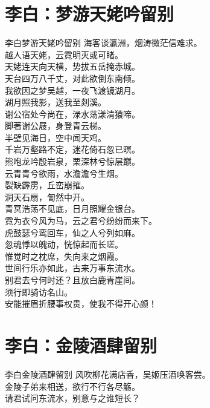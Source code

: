 \documentclass[12pt,oneside,a5paper]{book}
\begin{document}
\chapter{李白：梦游天姥吟留别}
\begin{poemzh}{李白}{梦游天姥吟留别}
海客谈瀛洲，烟涛微茫信难求。\\
越人语天姥，云霓明灭或可睹。\\
天姥连天向天横，势拔五岳掩赤城。\\
天台四万八千丈，对此欲倒东南倾。\\
我欲因之梦吴越，一夜飞渡镜湖月。\\
湖月照我影，送我至剡溪。\\
谢公宿处今尚在，渌水荡漾清猿啼。\\
脚著谢公屐，身登青云梯。\\
半壁见海日，空中闻天鸡。\\
千岩万壑路不定，迷花倚石忽已暝。\\
熊咆龙吟殷岩泉，栗深林兮惊层巅。\\
云青青兮欲雨，水澹澹兮生烟。\\
裂缺霹雳，丘峦崩摧。\\
洞天石扇，訇然中开。\\
青冥浩荡不见底，日月照耀金银台。\\
霓为衣兮风为马，云之君兮纷纷而来下。\\
虎鼓瑟兮鸾回车，仙之人兮列如麻。\\
忽魂悸以魄动，恍惊起而长嗟。\\
惟觉时之枕席，失向来之烟霞。\\
世间行乐亦如此，古来万事东流水。\\
别君去兮何时还？且放白鹿青崖间。\\
须行即骑访名山。\\
安能摧眉折腰事权贵，使我不得开心颜！\\ 
\end{poemzh}

\chapter{李白：金陵酒肆留别}
\begin{poemzh}{李白}{金陵酒肆留别}
风吹柳花满店香，吴姬压酒唤客尝。\\
金陵子弟来相送，欲行不行各尽觞。\\
请君试问东流水，别意与之谁短长？\\ 
\end{poemzh}
\end{document}
